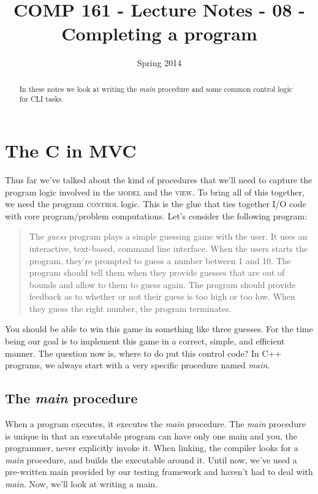 \documentclass[]{tufte-handout}
\title{COMP 161 - Lecture Notes - 08 - Completing a program }
\date{Spring 2014}
\begin{document}
 
\maketitle

\begin{abstract}
In these notes we look at writing the \textit{main} procedure and some common control logic for CLI tasks.
\end{abstract}

\section{The C in \textsc{MVC} }

Thus far we've talked about the kind of procedures that we'll need to capture the program logic involved in the \textsc{model} and the \textsc{view}. To bring all of this together, we need the program \textsc{control} logic.  This is the glue that ties together \textsc{I/O} code with core program/problem computations. Let's consider the following program:
\begin{framed}
\begin{quote}
The \textit{guess} program plays a simple guessing game with the user.  It uses an interactive, text-based, command line interface. When the users starts the program, they're prompted to guess a number between 1 and 10. The program should tell them when they provide guesses that are out of bounds and allow to them to guess again. The program should provide feedback as to whether or not their guess is too high or too low. When they guess the right number, the program terminates.
\end{quote}
\end{framed}
You should be able to win this game in something like three guesses. For the time being our goal is to implement this game in a correct, simple, and efficient manner. The question now is, where to do put this control code?  In C++ programs, we always start with a very specific procedure named \textit{main}.


\subsection{The \textit{main} procedure}

When a program executes, it executes the \textit{main} procedure.  The \textit{main} procedure is unique in that an executable program can have only one main and you, the programmer, never explicitly invoke it. When linking, the compiler looks for a \textit{main} procedure, and builds the executable around it. Until now, we've used a pre-written main provided by our testing framework and haven't had to deal with \textit{main}.  Now, we'll look at writing a main.  
\end{document}
